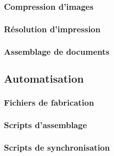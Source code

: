 \subsubsection{Compression d’images}

\subsubsection{Résolution d’impression}

\subsubsection{Assemblage de documents}

\subsection{Automatisation}

\subsubsection{Fichiers de fabrication}

\subsubsection{Scripts d’assemblage}

\subsubsection{Scripts de synchronisation}

\pagebreak
